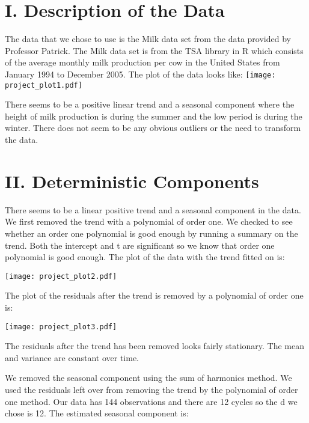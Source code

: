 \documentclass{article}
\begin{document}
\singlespace



\doublespace 

\flushleft

\section*{I. Description of the Data}

The data that we chose to use is the Milk data set from the data provided by Professor Patrick. The Milk data set is from the TSA library in R which consists of the average monthly milk production per cow in the United States from January 1994 to December 2005. The plot of the data looks like: 
\texttt{[image: project\_plot1.pdf]}

There seems to be a positive linear trend and a seasonal component where the height of milk production is during the summer and the low period is during the winter. There does not seem to be any obvious outliers or the need to transform the data.

\section*{II. Deterministic Components}

There seems to be a linear positive trend and a seasonal component in the data. We first removed the trend with a polynomial of order one. We checked to see whether an order one polynomial is good enough by running a summary on the trend. Both the intercept and t are significant so we know that order one polynomial is good enough. The plot of the data with the trend fitted on is: 

\texttt{[image: project\_plot2.pdf]}

The plot of the residuals after the trend is removed by a polynomial of order one is:

\texttt{[image: project\_plot3.pdf]}

The residuals after the trend has been removed looks fairly stationary. The mean and variance are constant over time.

We removed the seasonal component using the sum of harmonics method. We used the residuals left over from removing the trend by the polynomial of order one method. Our data has 144 observations and there are 12 cycles so the d we chose is 12. The estimated seasonal component is:  
\end{document}
